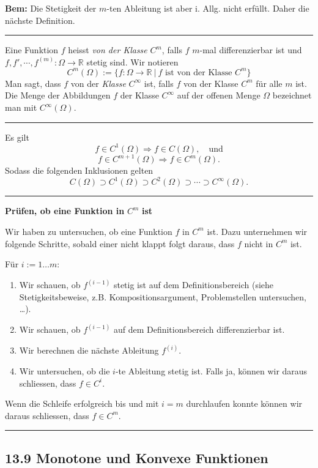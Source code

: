 \documentclass[a4paper,landscape,8pt]{extarticle}
\newcommand{\R}{\mathbb{R}}
\newcommand{\setsep}{\ \vert \ }
\newcommand{\sep}{\vspace{5pt}\noindent\hrule\vspace{5pt}}
\newcommand{\Bem}{\textbf{Bem: }}
\begin{document}
\begin{multicols*}{4}
\Bem Die Stetigkeit der $m$-ten Ableitung ist aber i. Allg. nicht erfüllt. Daher
die nächste Definition.

\sep

\Def Eine Funktion $f$ heisst \emph{von der Klasse} $C^m$, falls $f$ $m$-mal
differenzierbar ist und $f, f', \cdots, f^{(m)} \colon \Omega\to\R$ stetig sind.
Wir notieren
\[
C^m(\Omega):=\{f\colon\Omega\to\R \setsep f \text{ ist von der Klasse } C^m\}
\]
Man sagt, dass $f$ von der \emph{Klasse} $C^\infty$ ist, falls $f$ von der
Klasse $C^m$ für alle $m$ ist. Die Menge der Abbildungen $f$ der Klasse
$C^\infty$ auf der offenen Menge $\Omega$ bezeichnet man mit $C^\infty(\Omega)$.

\sep

\Satz Es gilt
\[
f\in C^1(\Omega) \Longrightarrow f\in C(\Omega), \quad \text{und}
\]
\[
f\in C^{m+1}(\Omega) \Longrightarrow f\in C^{m} (\Omega).
\]
Sodass die folgenden Inklusionen gelten
\[
C(\Omega)\supset C^1(\Omega)\supset C^2(\Omega) \supset \cdots
\supset C^\infty(\Omega).
\]

\sep

\textbf{Prüfen, ob eine Funktion in} $C^m$ \textbf{ist}

\Vorgehen Wir haben zu untersuchen, ob eine Funktion $f$ in $C^m$ ist. Dazu
unternehmen wir folgende Schritte, sobald einer nicht klappt folgt daraus, dass
$f$ nicht in $C^m$ ist.

Für $i:= 1\ldots m$:
\begin{enumerate}
  \item Wir schauen, ob $f^{(i-1)}$ stetig ist auf dem Definitionsbereich (siehe
  Stetigkeitsbeweise, z.B. Kompositionsargument, Problemstellen untersuchen,
  \ldots).
  \item Wir schauen, ob $f^{(i-1)}$ auf dem Definitionsbereich differenzierbar
  ist.
  \item Wir berechnen die nächste Ableitung $f^{(i)}$.
  \item Wir untersuchen, ob die $i$-te Ableitung stetig ist. Falls ja, können
  wir daraus schliessen, dass $f\in C^i$.
\end{enumerate}
Wenn die Schleife erfolgreich bis und mit $i=m$ durchlaufen konnte können wir
daraus schliessen, dass $f\in C^m$.

\sep

\subsection{13.9 Monotone und Konvexe Funktionen}


\end{multicols*}
\end{document}
